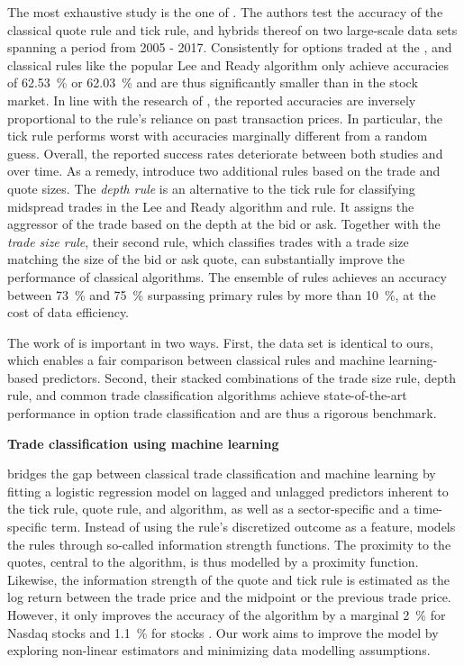 The most exhaustive study is the one of \textcite[1--39]{grauerOptionTradeClassification2022}.  The authors test the accuracy of the classical quote rule and tick rule, and hybrids thereof on two large-scale data sets spanning a period from 2005 - 2017. Consistently for options traded at the , and  classical rules like the popular Lee and Ready algorithm only achieve accuracies of \SI{62.53}{\percent} or \SI{62.03}{\percent} and are thus significantly smaller than in the stock market. In line with the research of  \textcite[886]{savickasInferringDirectionOption2003}, the reported accuracies are inversely proportional to the rule's reliance on past transaction prices. In particular, the tick rule performs worst with accuracies marginally different from a random guess. Overall, the reported success rates deteriorate between both studies and over time. As a remedy, \textcite[14--17]{grauerOptionTradeClassification2022} introduce two additional rules based on the trade and quote sizes. The \textit{depth rule} is an alternative to the tick rule for classifying midspread trades in the Lee and Ready algorithm and  rule. It assigns the aggressor of the trade based on the depth at the bid or ask. Together with the \textit{trade size rule}, their second rule, which classifies trades with a trade size matching the size of the bid or ask quote, can substantially improve the performance of classical algorithms. The ensemble of rules achieves an accuracy between \SI{73}{\percent} and \SI{75}{\percent} surpassing primary rules by more than \SI{10}{\percent}, at the cost of data efficiency.

The work of \textcite[1--39]{grauerOptionTradeClassification2022} is important in two ways. First, the data set is identical to ours, which enables a fair comparison between classical rules and machine learning-based predictors. Second, their stacked combinations of the trade size rule, depth rule, and common trade classification algorithms achieve state-of-the-art performance in option trade classification and are thus a rigorous benchmark.

\textbf{Trade classification using machine learning}

\textcite[5]{rosenthalModelingTradeDirection2012} bridges the gap between classical trade classification and machine learning by fitting a logistic regression model on lagged and unlagged predictors inherent to the tick rule, quote rule, and  algorithm, as well as a sector-specific and a time-specific term. Instead of using the rule's discretized outcome as a feature, \textcite[481--482]{rosenthalModelingTradeDirection2012} models the rules through so-called information strength functions. The proximity to the quotes, central to the  algorithm, is thus modelled by a proximity function. Likewise, the information strength of the quote and tick rule is estimated as the log return between the trade price and the midpoint or the previous trade price. However, it only improves the accuracy of the  algorithm by a marginal \SI{2}{\percent} for Nasdaq stocks and \SI{1.1}{\percent} for  stocks \textcite[15]{rosenthalModelingTradeDirection2012}. Our work aims to improve the model by exploring non-linear estimators and minimizing data modelling assumptions.

